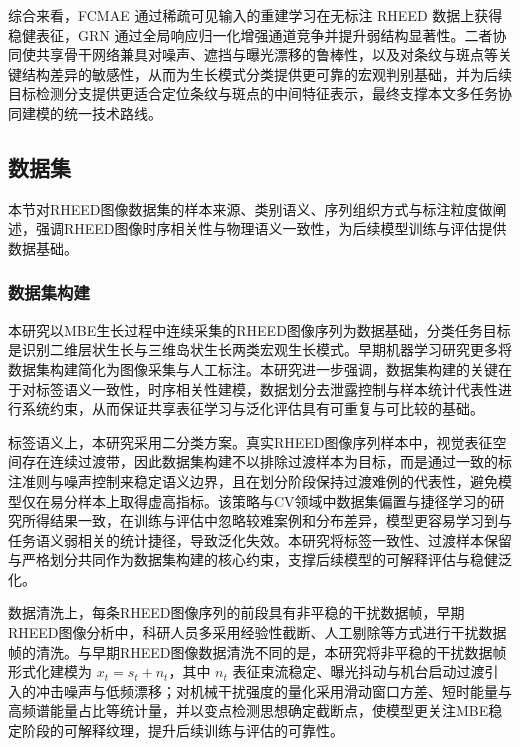 综合来看，FCMAE 通过稀疏可见输入的重建学习在无标注 RHEED 数据上获得稳健表征，GRN 通过全局响应归一化增强通道竞争并提升弱结构显著性。二者协同使共享骨干网络兼具对噪声、遮挡与曝光漂移的鲁棒性，以及对条纹与斑点等关键结构差异的敏感性，从而为生长模式分类提供更可靠的宏观判别基础，并为后续目标检测分支提供更适合定位条纹与斑点的中间特征表示，最终支撑本文多任务协同建模的统一技术路线。

\subsection{数据集}
\label{subsec:cp2_dataset}
本节对RHEED图像数据集的样本来源、类别语义、序列组织方式与标注粒度做阐述，强调RHEED图像时序相关性与物理语义一致性，为后续模型训练与评估提供数据基础。

\subsubsection{数据集构建}
本研究以MBE生长过程中连续采集的RHEED图像序列为数据基础，分类任务目标是识别二维层状生长与三维岛状生长两类宏观生长模式。早期机器学习研究更多将数据集构建简化为图像采集与人工标注。本研究进一步强调，数据集构建的关键在于对标签语义一致性，时序相关性建模，数据划分去泄露控制与样本统计代表性进行系统约束，从而保证共享表征学习与泛化评估具有可重复与可比较的基础。

标签语义上，本研究采用二分类方案。真实RHEED图像序列样本中，视觉表征空间存在连续过渡带，因此数据集构建不以排除过渡样本为目标，而是通过一致的标注准则与噪声控制来稳定语义边界，且在划分阶段保持过渡难例的代表性，避免模型仅在易分样本上取得虚高指标。该策略与CV领域中数据集偏置与捷径学习的研究所得结果一致，在训练与评估中忽略较难案例和分布差异，模型更容易学习到与任务语义弱相关的统计捷径，导致泛化失效。本研究将标签一致性、过渡样本保留与严格划分共同作为数据集构建的核心约束，支撑后续模型的可解释评估与稳健泛化。

数据清洗上，每条RHEED图像序列的前段具有非平稳的干扰数据帧，早期RHEED图像分析中，科研人员多采用经验性截断、人工剔除等方式进行干扰数据帧的清洗。与早期RHEED图像数据清洗不同的是，本研究将非平稳的干扰数据帧形式化建模为 $x_t = s_t + n_t$，其中 $n_t$ 表征束流稳定、曝光抖动与机台启动过渡引入的冲击噪声与低频漂移；对机械干扰强度的量化采用滑动窗口方差、短时能量与高频谱能量占比等统计量，并以变点检测思想确定截断点，使模型更关注MBE稳定阶段的可解释纹理，提升后续训练与评估的可靠性。

